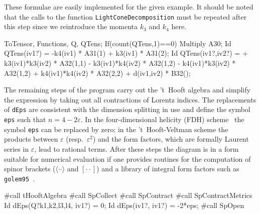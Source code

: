 \documentclass[preprint,number,12pt,sort&compress]{elsarticle}
\newcommand{\Spaa}[1]{\langle #1 \rangle}
\newcommand{\Spbb}[1]{[ #1 ]}
\begin{document}
These formulae are easily implemented for the given example.
It should be noted that the calls to the function
\texttt{LightConeDecomposition} must be repeated
after this step since we reintroduce the momenta $k_3$ and $k_4$
here.
\begin{spform}
ToTensor, Functions, Q, QTens;
If(count(QTens,1)==0) Multiply A30;
Id QTens(iv1?) = -k4(iv1) * A31(1) + k3(iv1) * A31(2);
Id QTens(iv1?,iv2?) =
   + k3(iv1)*k3(iv2) * A32(1,1)
   - k3(iv1)*k4(iv2) * A32(1,2)
   - k4(iv1)*k3(iv2) * A32(1,2)
   + k4(iv1)*k4(iv2) * A32(2,2)
   + d(iv1,iv2) * B32();
\end{spform}

The remaining steps of the program carry out the 't~Hooft algebra
and simplify the expression by taking out all contractions of Lorentz
indices. The replacements of \texttt{dEps} are consistent with
the dimension splitting in use and define the symbol \texttt{eps} such that
$n=4-2\varepsilon$. In the four-dimensional helicity (FDH) scheme~\cite{%
Bern:1991aq,Kunszt:1993sd,Catani:1996pk,Catani:2000ef,Signer:2008va}
the symbol \texttt{eps} can be replaced by zero; in the 't~Hooft-Veltman
scheme the products between $\varepsilon$ (resp.~$\varepsilon^2$) and the
form factors, which are formally Laurent series in $\varepsilon$, lead to
rational terms. After these steps the diagram is in a form suitable for
numerical evaluation if one provides routines for the computation of
spinor brackets ($\Spaa{\cdot\cdot}$ and $\Spbb{\cdot\cdot}$)
and a library of integral form factors such as
\texttt{golem95}~\cite{Binoth:2008uq}.

\begin{spform}
#call tHooftAlgebra
#call SpCollect
#call SpContract
#call SpContractMetrics
Id dEps(Q?{k1,k2,l3,l4}, iv1?) = 0;
Id dEps(iv1?, iv1?) = -2*eps;
#call SpOpen
\end{spform}
\end{document}

